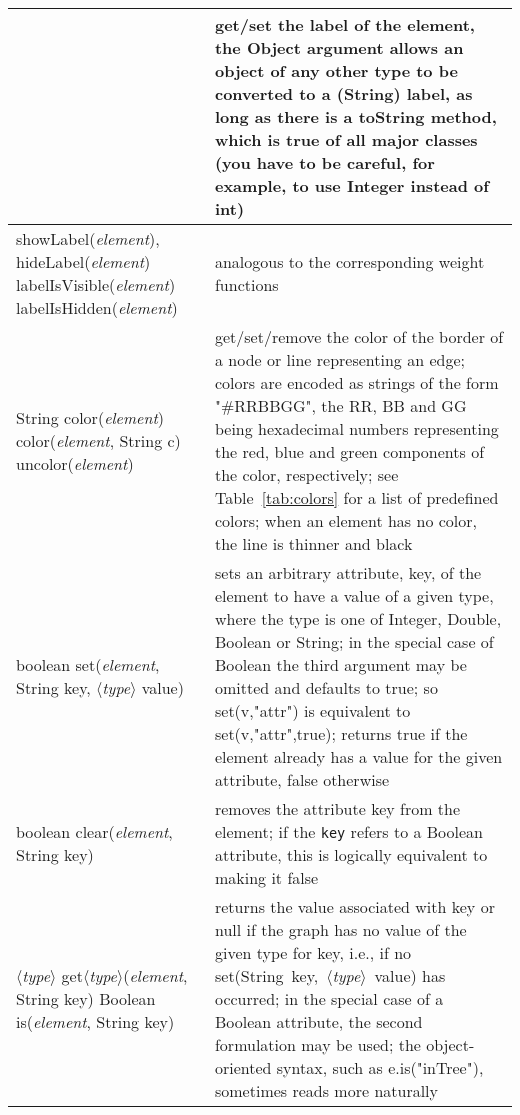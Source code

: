 \begin{table}
\begin{tabular}{| m{} | m{} |}
{    }
    &
    get/set the label of the element, the \textsf{Object} argument allows an object
    of any other type to be converted to a (\textsf{String}) label,
    as long as there is a \textsf{toString} method, which is true of all major classes
    (you have to be careful, for example, to use \textsf{Integer} instead of \textsf{int})
    \\ \hline
    \shortstack[l]{
      \textsf{showLabel(\emph{element})},
      \textsf{hideLabel(\emph{element})}\\
      \textsf{labelIsVisible(\emph{element})}\\
      \textsf{labelIsHidden(\emph{element})}
    }
    &
    analogous to the corresponding weight functions
    \\ \hline
     \shortstack[l]{
      \textsf{String color(\emph{element})}\\
      \textsf{color(\emph{element}, String c)}\\
      \textsf{uncolor(\emph{element})}
    }
    &
    get/set/remove the color of the border of a node or line representing an edge;
    colors are encoded as strings of the form
    \textsf{"\#RRBBGG"}, the RR, BB and GG being hexadecimal numbers representing the
    red, blue and green components of the color, respectively; see Table~\ref{tab:colors}
    for a list of predefined colors;
    when an element has no color, the line is thinner and black
    \\ \hline
    \textsf{boolean set(\emph{element}, String key, $\langle$\emph{type}$\rangle$ value)}
    &
    sets an arbitrary attribute, \textsf{key}, of the element to have a value of a given type, where
    the type is one of \textsf{Integer}, \textsf{Double}, \textsf{Boolean}
    or \textsf{String};
    in the special case of \textsf{Boolean} the third argument may be omitted
    and defaults to \textsf{true};
    so \textsf{set(v,"attr")} is equivalent to \textsf{set(v,"attr",true)};
    returns \textsf{true} if the element already has a value for the given attribute,
    \textsf{false} otherwise
    \\ \hline
    \textsf{boolean clear(\emph{element}, String key)}
    &
    removes the attribute \textsf{key} from the element; if the \texttt{key} refers to
    a Boolean attribute, this is logically equivalent to making it false
    \\ \hline
    \shortstack[l]{
    \textsf{$\langle$\emph{type}$\rangle$ get$\langle$\emph{type}$\rangle$(\emph{element}, String key)}\\
    \textsf{Boolean is(\emph{element}, String key)}
    }
    &
    returns the value associated with \textsf{key} or \textsf{null}
    if the graph has no value of the given type for \textsf{key}, i.e.,
    if no
    \textsf{set(String~key,~$\langle$\emph{type}$\rangle$~value)} has occurred;
    in the special case of a \textsf{Boolean} attribute, the second formulation
    may be used;
    the object-oriented syntax, such as \textsf{e.is("inTree")}, sometimes
    reads more naturally
    \\ \hline
  \end{tabular}


\end{table}

